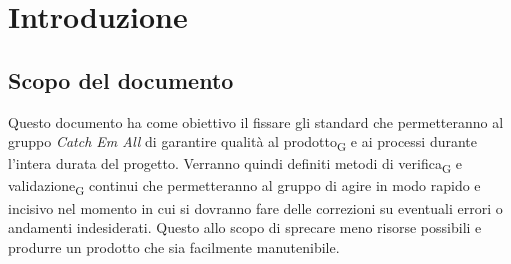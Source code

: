 \section{Introduzione}

\subsection{Scopo del documento}
Questo documento ha come obiettivo il fissare gli standard che permetteranno al gruppo \textit{Catch Em All} di garantire qualità al prodotto\textsubscript{G} e ai processi durante l'intera durata del progetto. Verranno quindi definiti metodi di verifica\textsubscript{G} e validazione\textsubscript{G} continui che permetteranno al gruppo di agire in modo rapido e incisivo nel momento in cui si dovranno fare delle correzioni su eventuali errori o andamenti indesiderati. Questo allo scopo di sprecare meno risorse possibili e produrre un prodotto che sia facilmente manutenibile. 

